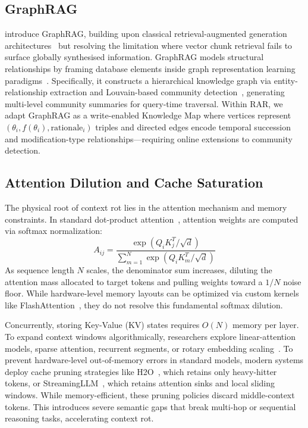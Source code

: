 \documentclass[conference]{IEEEtran}
\begin{document}
\subsection{GraphRAG}
\citet{edge2024graphrag} introduce GraphRAG, building upon classical retrieval-augmented generation architectures~\citep{lewis2020retrieval,guu2020realm,borgeaud2022improving} but resolving the limitation where vector chunk retrieval fails to surface globally synthesised information. GraphRAG models structural relationships by framing database elements inside graph representation learning paradigms~\citep{kipf2016semi,velickovic2018graph,hamilton2017inductive}. Specifically, it constructs a hierarchical knowledge graph via entity-relationship extraction and Louvain-based community detection~\citep{blondel2008louvain}, generating multi-level community summaries for query-time traversal. Within RAR, we adapt GraphRAG as a write-enabled Knowledge Map where vertices represent $(\theta_i, f(\theta_i), \text{rationale}_i)$ triples and directed edges encode temporal succession and modification-type relationships---requiring online extensions to community detection.

\subsection{Attention Dilution and Cache Saturation}
The physical root of context rot lies in the attention mechanism and memory constraints. In standard dot-product attention~\citep{vaswani2017attention}, attention weights are computed via softmax normalization:
\begin{equation}
  A_{ij} = \frac{\exp(Q_i K_j^T / \sqrt{d})}{\sum_{m=1}^{N} \exp(Q_i K_m^T / \sqrt{d})}
  \label{eq:softmax_attention}
\end{equation}
As sequence length $N$ scales, the denominator sum increases, diluting the attention mass allocated to target tokens and pulling weights toward a $1/N$ noise floor. While hardware-level memory layouts can be optimized via custom kernels like FlashAttention~\citep{dao2022flashattention,dao2023flashattention2}, they do not resolve this fundamental softmax dilution.

Concurrently, storing Key-Value (KV) states requires $O(N)$ memory per layer. To expand context windows algorithmically, researchers explore linear-attention models, sparse attention, recurrent segments, or rotary embedding scaling~\citep{beltagy2020longformer,kitaev2020reformer,katharopoulos2020transformers,bulatov2022recurrent,rae2019compressive,child2019generating,xiong2023effective,peng2023yarn}. To prevent hardware-level out-of-memory errors in standard models, modern systems deploy cache pruning strategies like H2O~\citep{zhang2023h2o}, which retains only heavy-hitter tokens, or StreamingLLM~\citep{xiao2023efficient}, which retains attention sinks and local sliding windows. While memory-efficient, these pruning policies discard middle-context tokens. This introduces severe semantic gaps that break multi-hop or sequential reasoning tasks, accelerating context rot.
\end{document}

